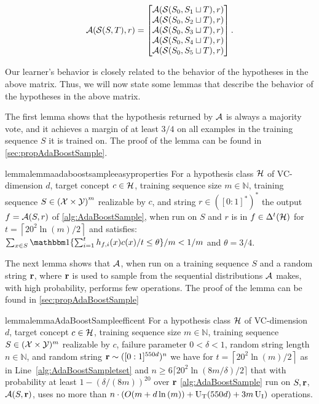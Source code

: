 \begin{align*}
    \mathcal{A}(\mathcal{S}(S,T),r)=
    \begin{bmatrix}
      \mathcal{A}(\mathcal{S}(S_0,S_{1}\sqcup T),r)\\
      \mathcal{A}(\mathcal{S}(S_0,S_{2}\sqcup T),r)\\
      \mathcal{A}(\mathcal{S}(S_{0},S_{3}\sqcup T),r)\\
      \mathcal{A}(\mathcal{S}(S_{0},S_{4}\sqcup T),r)\\
      \mathcal{A}(\mathcal{S}(S_{0},S_{5}\sqcup T),r)
    \end{bmatrix}.
\end{align*}


Our learner's behavior is closely related to the behavior of the hypotheses in the above matrix. Thus, we will now state some lemmas that describe the behavior of the hypotheses in the above matrix. 

The first lemma shows that the hypothesis returned by $\mathcal{A}$ is always a majority vote, and it achieves a margin of at least $ 3/4$  on all examples in the training sequence $S$ it is trained on. The proof of the lemma can be found in \cref{sec:propAdaBoostSample}.

\begin{restatable}{lemma}{lemmaadaboostsampleeasyproperties}\label{lemma:adaboostsampleeasyproperties}
  For a hypothesis class $\mathcal{H}$ of VC-dimension $d$, target concept $ c\in \mathcal{H} $, training sequence size $m\in\mathbb{N}$, training sequence $S\in \left(\mathcal{X}\times\mathcal{Y}\right)^{m}$ 
  realizable by $c$,  and string $r\in([0:1]^{*})^{*}$ the output $f=\mathcal{A}(S,r)$ of \cref{alg:AdaBoostSample}, when run on 
  $S$ and $r$ is in $f\in\Delta^{t}(\mathcal{H})$ for $t=\left\lceil20^{2}\ln{(m)}/2\right\rceil$ and satisfies: 
  $\sum_{x\in S} \ind\{\sum_{i=1}^{t} h_{f,i}(x)c(x)/t\leq \theta \}/m <1/m$ and $\theta=3/4$.
\end{restatable}
The next lemma shows that $\mathcal{A}$, when run on a training sequence $S$ and a random string $\mathbf{r}$, where $ \mathbf{r} $  is used to sample from the sequential distributions $ \mathcal{A} $ makes, with high probability, performs few operations. The proof of the lemma can be found in \cref{sec:propAdaBoostSample}

\begin{restatable}{lemma}{lemmaAdaBoostSampleefficent}\label{lemmaAdaBoostSampleefficent}
  For a hypothesis class $\mathcal{H}$ of VC-dimension $d$, target concept $c\in \mathcal{H}  $, training sequence size $ m\in\mathbb{N} $, training sequence   $S\in(\mathcal{X}\times \mathcal{Y})^{m}$ realizable by $c$, failure parameter $0<\delta <1$, random string length $n\in\mathbb{N}$, and random string $\mathbf{r}\sim ([0:1]^{550d})^{n}$ we have for $t=\left\lceil20^{2}\ln{(m)}/2\right\rceil$ as in Line~\ref{alg:AdaBoostSampletset} and $n\geq 6\lceil20^{2}\ln{(8m/\delta)}/2\rceil$ that with probability at least $1-(\delta/(8m))^{20}$ over $ \mathbf{r} $  \cref{alg:AdaBoostSample} run on $S,\mathbf{r}$, $\mathcal{A}(S,\mathbf{r})$, uses no more than
$n\cdot (O(m+d\ln{(m )})+\operatorname{U_{T}}(550d)+3m\operatorname{U_{I}})$ operations.
\end{restatable}

